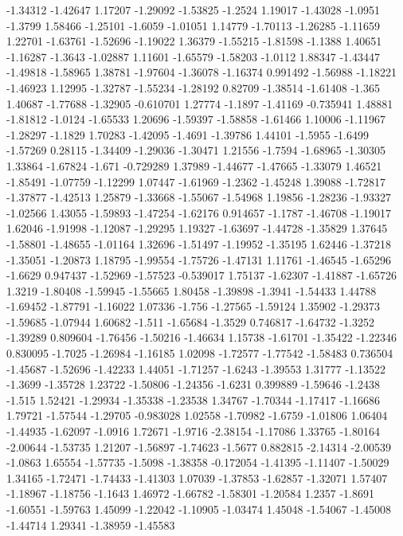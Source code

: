 \documentclass[9pt]{article}
\theoremstyle{plain}
\theoremstyle{definition}
\theoremstyle{remark}
\numberwithin{equation}{section}
\begin{document}
-1.34312
-1.42647
1.17207
-1.29092
-1.53825
-1.2524
1.19017
-1.43028
-1.0951
-1.3799
1.58466
-1.25101
-1.6059
-1.01051
1.14779
-1.70113
-1.26285
-1.11659
1.22701
-1.63761
-1.52696
-1.19022
1.36379
-1.55215
-1.81598
-1.1388
1.40651
-1.16287
-1.3643
-1.02887
1.11601
-1.65579
-1.58203
-1.0112
1.88347
-1.43447
-1.49818
-1.58965
1.38781
-1.97604
-1.36078
-1.16374
0.991492
-1.56988
-1.18221
-1.46923
1.12995
-1.32787
-1.55234
-1.28192
0.82709
-1.38514
-1.61408
-1.365
1.40687
-1.77688
-1.32905
-0.610701
1.27774
-1.1897
-1.41169
-0.735941
1.48881
-1.81812
-1.0124
-1.65533
1.20696
-1.59397
-1.58858
-1.61466
1.10006
-1.11967
-1.28297
-1.1829
1.70283
-1.42095
-1.4691
-1.39786
1.44101
-1.5955
-1.6499
-1.57269
0.28115
-1.34409
-1.29036
-1.30471
1.21556
-1.7594
-1.68965
-1.30305
1.33864
-1.67824
-1.671
-0.729289
1.37989
-1.44677
-1.47665
-1.33079
1.46521
-1.85491
-1.07759
-1.12299
1.07447
-1.61969
-1.2362
-1.45248
1.39088
-1.72817
-1.37877
-1.42513
1.25879
-1.33668
-1.55067
-1.54968
1.19856
-1.28236
-1.93327
-1.02566
1.43055
-1.59893
-1.47254
-1.62176
0.914657
-1.1787
-1.46708
-1.19017
1.62046
-1.91998
-1.12087
-1.29295
1.19327
-1.63697
-1.44728
-1.35829
1.37645
-1.58801
-1.48655
-1.01164
1.32696
-1.51497
-1.19952
-1.35195
1.62446
-1.37218
-1.35051
-1.20873
1.18795
-1.99554
-1.75726
-1.47131
1.11761
-1.46545
-1.65296
-1.6629
0.947437
-1.52969
-1.57523
-0.539017
1.75137
-1.62307
-1.41887
-1.65726
1.3219
-1.80408
-1.59945
-1.55665
1.80458
-1.39898
-1.3941
-1.54433
1.44788
-1.69452
-1.87791
-1.16022
1.07336
-1.756
-1.27565
-1.59124
1.35902
-1.29373
-1.59685
-1.07944
1.60682
-1.511
-1.65684
-1.3529
0.746817
-1.64732
-1.3252
-1.39289
0.809604
-1.76456
-1.50216
-1.46634
1.15738
-1.61701
-1.35422
-1.22346
0.830095
-1.7025
-1.26984
-1.16185
1.02098
-1.72577
-1.77542
-1.58483
0.736504
-1.45687
-1.52696
-1.42233
1.44051
-1.71257
-1.6243
-1.39553
1.31777
-1.13522
-1.3699
-1.35728
1.23722
-1.50806
-1.24356
-1.6231
0.399889
-1.59646
-1.2438
-1.515
1.52421
-1.29934
-1.35338
-1.23538
1.34767
-1.70344
-1.17417
-1.16686
1.79721
-1.57544
-1.29705
-0.983028
1.02558
-1.70982
-1.6759
-1.01806
1.06404
-1.44935
-1.62097
-1.0916
1.72671
-1.9716
-2.38154
-1.17086
1.33765
-1.80164
-2.00644
-1.53735
1.21207
-1.56897
-1.74623
-1.5677
0.882815
-2.14314
-2.00539
-1.0863
1.65554
-1.57735
-1.5098
-1.38358
-0.172054
-1.41395
-1.11407
-1.50029
1.34165
-1.72471
-1.74433
-1.41303
1.07039
-1.37853
-1.62857
-1.32071
1.57407
-1.18967
-1.18756
-1.1643
1.46972
-1.66782
-1.58301
-1.20584
1.2357
-1.8691
-1.60551
-1.59763
1.45099
-1.22042
-1.10905
-1.03474
1.45048
-1.54067
-1.45008
-1.44714
1.29341
-1.38959
-1.45583
\end{document}
